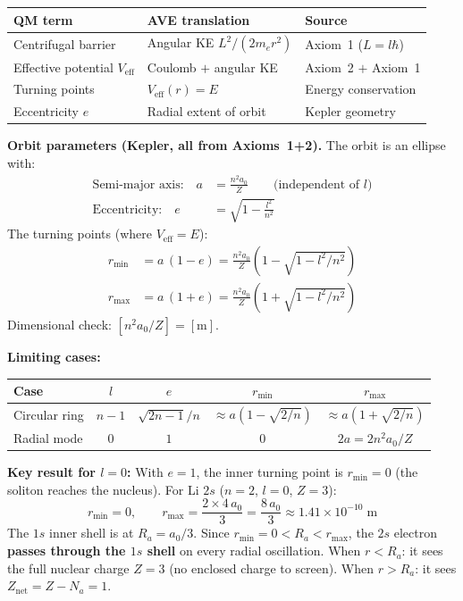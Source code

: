 \begin{center}
\small
\renewcommand{\arraystretch}{1.2}
\begin{tabular}{lll}
\hline
\textbf{QM term} & \textbf{AVE translation}
& \textbf{Source} \\
\hline
Centrifugal barrier & Angular KE $L^2/(2m_e r^2)$
& Axiom~1 ($L = l\hbar$) \\
Effective potential $V_{\text{eff}}$ &
Coulomb $+$ angular KE
& Axiom~2 $+$ Axiom~1 \\
Turning points & $V_{\text{eff}}(r) = E$
& Energy conservation \\
Eccentricity $e$ & Radial extent of orbit
& Kepler geometry \\
\hline
\end{tabular}
\end{center}

\noindent\textbf{Orbit parameters (Kepler, all from
Axioms~1+2).}
The orbit is an ellipse with:
\begin{align}
    \text{Semi-major axis:}\quad
    a &= \frac{n^2 a_0}{Z}
    \qquad\text{(independent of $l$)}
    \label{eq:semi_major} \\
    \text{Eccentricity:}\quad
    e &= \sqrt{1 - \frac{l^2}{n^2}}
    \label{eq:eccentricity}
\end{align}
The turning points (where $V_{\text{eff}} = E$):
\begin{align}
    r_{\min} &= a\,(1 - e)
    = \frac{n^2 a_0}{Z}
    \left(1 - \sqrt{1 - l^2/n^2}\right)
    \label{eq:r_min} \\
    r_{\max} &= a\,(1 + e)
    = \frac{n^2 a_0}{Z}
    \left(1 + \sqrt{1 - l^2/n^2}\right)
    \label{eq:r_max}
\end{align}
Dimensional check: $[n^2 a_0 / Z] = [\text{m}]$.
\checkmark

\noindent\textbf{Limiting cases:}
\begin{center}
\small
\renewcommand{\arraystretch}{1.3}
\begin{tabular}{lcccc}
\hline
\textbf{Case} & $l$ & $e$ & $r_{\min}$
& $r_{\max}$ \\
\hline
Circular ring & $n{-}1$
& $\sqrt{2n-1}/n$
& $\approx a(1{-}\sqrt{2/n})$
& $\approx a(1{+}\sqrt{2/n})$ \\
Radial mode & $0$ & $1$ & $0$
& $2a = 2n^2 a_0/Z$ \\
\hline
\end{tabular}
\end{center}

\noindent\textbf{Key result for $l = 0$:}
With $e = 1$, the inner turning point is $r_{\min} = 0$
(the soliton reaches the nucleus).
For Li $2s$ ($n=2$, $l=0$, $Z=3$):
\begin{equation}
    r_{\min} = 0, \qquad
    r_{\max} = \frac{2 \times 4\, a_0}{3}
    = \frac{8\,a_0}{3} \approx 1.41 \times 10^{-10}\;\text{m}
\end{equation}
The $1s$ inner shell is at $R_a = a_0/3$.
Since $r_{\min} = 0 < R_a < r_{\max}$,
the $2s$ electron \textbf{passes through the $1s$ shell}
on every radial oscillation.  When $r < R_a$:
it sees the full nuclear charge $Z = 3$ (no enclosed
charge to screen).  When $r > R_a$: it sees
$Z_{\text{net}} = Z - N_a = 1$.

